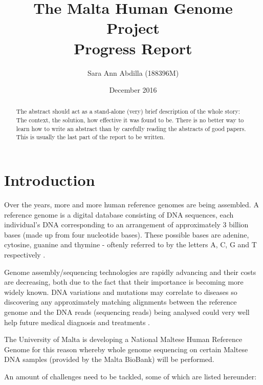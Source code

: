 \documentclass{csfyp}
\title{The Malta Human Genome Project \\
  \large Progress Report}
\author{Sara Ann Abdilla (188396M)}
\date{December 2016}
\begin{document}
\tableofcontents

\newpage

\setcounter{page}{1}


\begin{abstract}
The abstract should act as a stand-alone (very) brief description of the whole story: The context, the solution, how effective it was found to be. There is no better way to learn how to write an abstract than by carefully reading the abstracts of good papers. This is usually the last part of the report to be written.
\end{abstract}


\section{Introduction}
\label{s:intro}

Over the years, more and more human reference genomes are being assembled.  A reference genome is a digital database consisting of DNA sequences, each individual's DNA corresponding to an arrangement of approximately 3 billion bases (made up from four nucleotide bases).  These possible bases are adenine, cytosine, guanine and thymine - oftenly referred to by the letters A, C, G and T respectively \cite{aiBk, introgenom}.  

Genome assembly/sequencing technologies are rapidly advancing and their costs are decreasing, both due to the fact that their importance is becoming more widely known.  DNA variations and mutations may correlate to diseases so discovering any approximately matching alignments between the reference genome and the DNA reads (sequencing reads) being analysed could very well help future medical diagnosis and treatments \cite{think1, think2, think3}.

The University of Malta is developing a National Maltese Human Reference Genome for this reason whereby whole genome sequencing on certain Maltese DNA samples (provided by the Malta BioBank) will be performed.    
   
An amount of challenges need to be tackled, some of which are listed hereunder:
\end{document}
